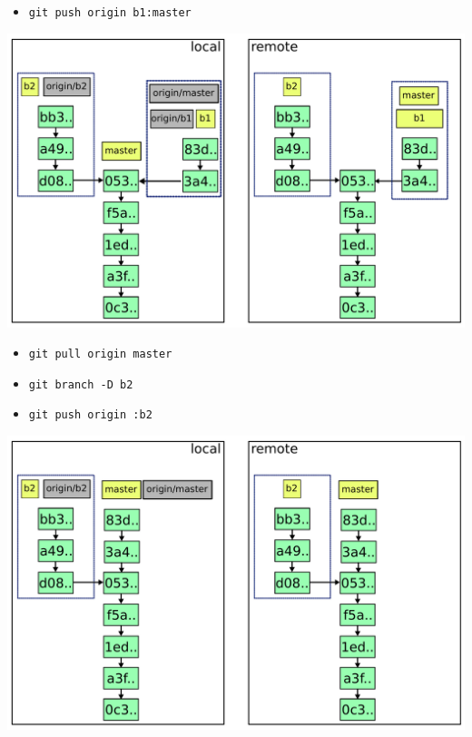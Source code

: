 \documentclass{beamer}
\begin{document}
\begin{frame}{}
  \begin{itemize}
  \item \lstinline|git push origin b1:master|
  \end{itemize}
\end{frame}

\begin{frame}{}
  \includegraphics[width=\textwidth]{img/7.pdf}
\end{frame}

\begin{frame}{}
  \begin{itemize}
  \item \lstinline|git pull origin master|
  \item \lstinline|git branch -D b2|
  \item \lstinline|git push origin :b2|
  \end{itemize}
\end{frame}

\begin{frame}{}
  \includegraphics[width=\textwidth]{img/8.pdf}
\end{frame}
\end{document}
